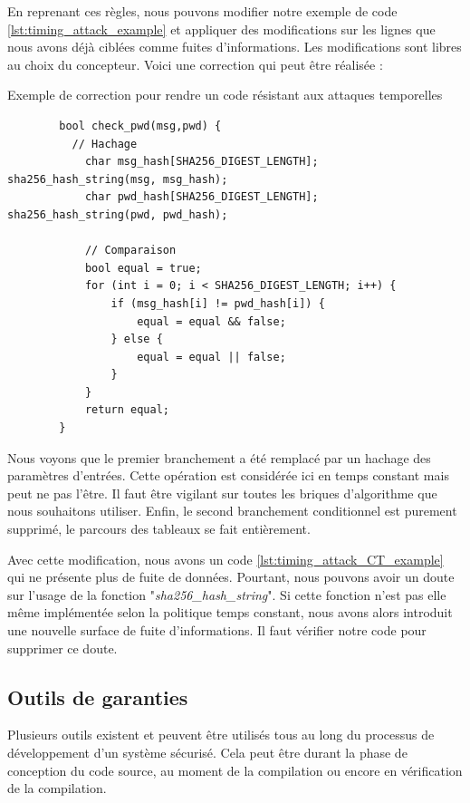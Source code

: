 En reprenant ces règles, nous pouvons modifier notre exemple de code \ref{lst:timing_attack_example} et appliquer des modifications sur les lignes que nous avons déjà ciblées comme fuites d'informations. Les modifications sont libres au choix du concepteur. Voici une correction qui peut être réalisée :

\begin{listing}[!htb]
    \caption{Exemple de correction pour rendre un code résistant aux attaques temporelles}
    \label{lst:timing_attack_CT_example}
    \begin{verbatim}
        bool check_pwd(msg,pwd) {
          // Hachage
            char msg_hash[SHA256_DIGEST_LENGTH]; sha256_hash_string(msg, msg_hash);
            char pwd_hash[SHA256_DIGEST_LENGTH]; sha256_hash_string(pwd, pwd_hash);

            // Comparaison
            bool equal = true;
            for (int i = 0; i < SHA256_DIGEST_LENGTH; i++) {
                if (msg_hash[i] != pwd_hash[i]) {
                    equal = equal && false;
                } else {
                    equal = equal || false;
                }
            }
            return equal;
        }
    \end{verbatim}
\end{listing}

Nous voyons que le premier branchement a été remplacé par un hachage des paramètres d'entrées. Cette opération est considérée ici en temps constant mais peut ne pas l'être. Il faut être vigilant sur toutes les briques d'algorithme que nous souhaitons utiliser. Enfin, le second branchement conditionnel est purement supprimé, le parcours des tableaux se fait entièrement.\bigbreak

Avec cette modification, nous avons un code \ref{lst:timing_attack_CT_example} qui ne présente plus de fuite de données. Pourtant, nous pouvons avoir un doute sur l'usage de la fonction "\textit{sha256\_hash\_string}". Si cette fonction n'est pas elle même implémentée selon la politique temps constant, nous avons alors introduit une nouvelle surface de fuite d'informations. Il faut vérifier notre code pour supprimer ce doute.\medbreak

\subsection*{Outils de garanties}

Plusieurs outils existent et peuvent être utilisés tous au long du processus de développement d'un système sécurisé. Cela peut être durant la phase de conception du code source, au moment de la compilation ou encore en vérification de la compilation.\smallbreak


